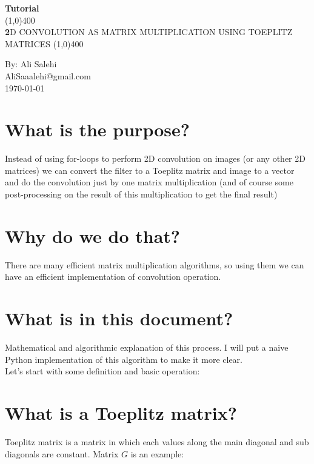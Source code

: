 \documentclass[11pt]{article}
\begin{document}
	\begin{titlepage}
		\begin{center}
			\vspace*{1cm}
			\large {\textbf{Tutorial}} \\
			\vfill
			\line(1,0){400} \\ [3mm]
			\MakeUppercase {\large \textbf 2D Convolution as Matrix Multiplication using Toeplitz Matrices}
			\line(1,0){400} \\
			\vfill
			
			By: Ali Salehi \\
			\small AliSaaalehi@gmail.com \\
			\today
		\end{center}
	\end{titlepage}
	
	\tableofcontents
	\thispagestyle{empty}
	\clearpage
	
	
	\section{What is the purpose?}
	Instead of using for-loops to perform 2D convolution on images (or any other 2D matrices) we can convert the filter to a Toeplitz matrix and image to a vector and do the convolution just by one matrix multiplication (and of course some post-processing on the result of this multiplication to get the final result)
	
	
	\section{Why do we do that?}
	There are many efficient matrix multiplication algorithms, so using them we can have an efficient implementation of convolution operation.
	
	\section{What is in this document?}
	Mathematical and algorithmic explanation of this process. I will put a naive Python implementation of this algorithm to make it more clear.\\
	Let's start with some definition and basic operation:
	
	\section{What is a Toeplitz matrix?}
	Toeplitz matrix is a matrix in which each values along the main diagonal and sub diagonals are constant. Matrix $G$ is an example:
	
\end{document}
